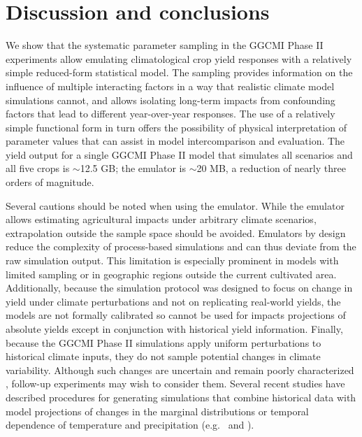 \documentclass[gmd, manuscript]{copernicus} %
\begin{document}
\section{Discussion and conclusions} 
\label{S:6}
We show that the systematic parameter sampling in the GGCMI Phase II experiments allow emulating climatological crop yield responses with a relatively simple reduced-form statistical model. 
The sampling provides information on the influence of multiple interacting factors in a way that realistic climate model simulations cannot, and allows isolating long-term impacts from confounding factors that lead to different year-over-year responses. 
The use of a relatively simple functional form in turn offers the possibility of physical interpretation of parameter values that can assist in model intercomparison and evaluation. 
The yield output for a single GGCMI Phase II model that simulates all scenarios and all five crops is $\sim$12.5 GB; the emulator is $\sim$20 MB, a reduction of nearly three orders of magnitude. 

Several cautions should be noted when using the emulator. While the emulator allows estimating agricultural impacts under arbitrary climate scenarios, extrapolation outside the sample space should be avoided. 
Emulators by design reduce the complexity of process-based simulations and can thus deviate from the raw simulation output. 
This limitation is especially prominent in models with limited sampling or in geographic regions outside the current cultivated area.
Additionally, because the simulation protocol was designed to focus on change in yield under climate perturbations and not on replicating real-world yields, the models are not formally calibrated so cannot be used for impacts projections of absolute yields except in conjunction with historical yield information. 
Finally, because the GGCMI Phase II simulations apply uniform perturbations to historical climate inputs, they do not sample potential changes in climate variability. 
Although such changes are uncertain and remain poorly characterized \citep[e.g.][]{Alexande2006, Kodra2014}, follow-up experiments may wish to consider them. 
Several recent studies have described procedures for generating simulations that combine historical data with model projections of changes in the marginal distributions or temporal dependence of temperature and precipitation (e.g.\ \citet{Leeds2015, poppick2016, Won16} and \citet{Haugen2018}).
\end{document}
